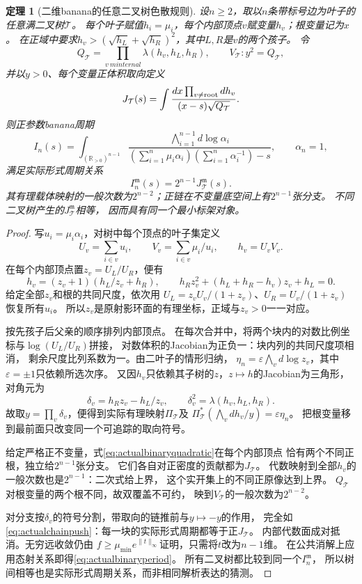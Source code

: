 \documentclass[11pt,a4paper]{ctexart}
\theoremstyle{cnplain}\newtheorem{theorem}{定理}[section]
\theoremstyle{definition}\newtheorem{definition}[theorem]{定义}
\theoremstyle{remark}\newtheorem{remark}[theorem]{注}
\begin{document}
\begin{theorem}[二维banana的任意二叉树色散规则]\label{thm:actualbinarytree}
设$n\geq2$，取以$n$条带标号边为叶子的任意满二叉树$\mathcal T$。
每个叶子赋值$h_i=\mu_i$，每个内部顶点$v$赋变量$h_v$；根变量记为$x$。
在正域中要求$h_v>(\sqrt{h_L}+\sqrt{h_R})^2$，其中$L,R$是$v$的两个孩子。
令
\[
 Q_{\mathcal T}=\prod_{v\ {
m internal}}\lambda(h_v,h_L,h_R),
 \qquad V_{\mathcal T}:y^2=Q_{\mathcal T},
\]
并以$y>0$、每个变量正体积取向定义
\[
 J_{\mathcal T}(s)=\int
    \frac{dx\prod_{v\ne{\rm root}}dh_v}{(x-s)\sqrt{Q_{\mathcal T}}}.
\]
则正参数banana周期
\[
 I_n(s)=\int_{(\mathbb R_{>0})^{n-1}}
  \frac{\bigwedge_{i=1}^{n-1}d\log\alpha_i}
  {(\sum_{i=1}^n\mu_i\alpha_i)(\sum_{i=1}^n\alpha_i^{-1})-s},
 \qquad \alpha_n=1,
\]
满足实际形式周期关系
\begin{equation}\label{eq:actualbinaryperiod}
                I_n^{\mathfrak m}(s)=2^{n-1}J_{\mathcal T}^{\mathfrak m}(s).
\end{equation}
其有理载体映射的一般次数为$2^{n-2}$；正链在不变量底空间上有$2^{n-1}$张分支。
不同二叉树产生的$J_{\mathcal T}^{\mathfrak m}$相等，
因而具有同一个最小标架对象。
\end{theorem}
\begin{proof}
写$u_i=\mu_i\alpha_i$，对树中每个顶点的叶子集定义
\[
 U_v=\sum_{i\in v}u_i,\qquad V_v=\sum_{i\in v}\mu_i/u_i,
 \qquad h_v=U_vV_v.
\]
在每个内部顶点置$z_v=U_L/U_R$，便有
\begin{equation}\label{eq:actualbinaryquadratic}
 h_v=(z_v+1)(h_L/z_v+h_R),\qquad
 h_Rz_v^2+(h_L+h_R-h_v)z_v+h_L=0.
\end{equation}
给定全部$z_v$和根的共同尺度，依次用
$U_L=z_vU_v/(1+z_v)$、$U_R=U_v/(1+z_v)$恢复所有$u_i$。
所以$z_v$是原射影环面的有理坐标，正域与$z_v>0$一一对应。

按先孩子后父亲的顺序排列内部顶点。
在每次合并中，将两个块内的对数比例坐标与$\log(U_L/U_R)$拼接，
对数体积的Jacobian为正负一：块内列的共同尺度项相消，
剩余尺度比列系数为一。由二叶子的情形归纳，
$\eta_n=\varepsilon\bigwedge_v d\log z_v$，其中$\varepsilon=\pm1$只依赖所选次序。
又因$h_v$只依赖其子树的$z$，$z\mapsto h$的Jacobian为三角形，
对角元为
\[
 \delta_v=h_Rz_v-h_L/z_v,\qquad
 \delta_v^2=\lambda(h_v,h_L,h_R).
\]
故取$y=\prod_v\delta_v$，便得到实际有理映射$\Pi_{\mathcal T}$及
$\Pi_{\mathcal T}^*(\bigwedge_v dh_v/y)=\varepsilon\eta_n$。
把根变量移到最前面只改变同一个可追踪的取向符号。

给定严格正不变量，式\eqref{eq:actualbinaryquadratic}在每个内部顶点
恰有两个不同正根，独立给$2^{n-1}$张分支。
它们各自对正密度的贡献都为$J_{\mathcal T}$。
代数映射到全部$h_v$的一般次数也是$2^{n-1}$：二次式给上界，
这个实开集上的不同正原像达到上界。
$Q_{\mathcal T}$对根变量的两个根不同，故双覆盖不可约，
映到$V_{\mathcal T}$的一般次数为$2^{n-2}$。

对分支按$\delta_v$的符号分割，带取向的链推前与$y\mapsto-y$的作用，
完全如\eqref{eq:actualchainpush}：每一块的实际形式周期都等于正$J_{\mathcal T}$。
内部代数面成对抵消。无穷远收敛仍由
$f\geq\mu_{\min}e^{\|t\|_\infty}$证明，只需将$t$改为$n-1$维。
在公共消解上应用态射关系即得\eqref{eq:actualbinaryperiod}。
所有二叉树都比较到同一个$I_n^{\mathfrak m}$，
所以树间相等也是实际形式周期关系，而非相同解析表达的猜测。
\end{proof}
\end{document}
